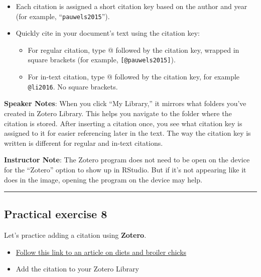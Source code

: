 \documentclass[
  letterpaper,
  DIV=11,
  numbers=noendperiod]{scrartcl}
\providecommand{\tightlist}{%
  \setlength{\itemsep}{0pt}\setlength{\parskip}{0pt}}
\begin{document}
\begin{itemize}
\item
  Each citation is assigned a short citation key based on the author and
  year (for example, ``\texttt{pauwels2015}'').
\item
  Quickly cite in your document's text using the citation key:

  \begin{itemize}
  \tightlist
  \item
    For regular citation, type @ followed by the citation key, wrapped
    in square brackets (for example, \texttt{{[}@pauwels2015{]}}).
  \item
    For in-text citation, type @ followed by the citation key, for
    example \texttt{@li2016}. No square brackets.
  \end{itemize}
\end{itemize}

\textbf{Speaker Notes}: When you click ``My Library,'' it mirrors what
folders you've created in Zotero Library. This helps you navigate to the
folder where the citation is stored. After inserting a citation once,
you see what citation key is assigned to it for easier referencing later
in the text. The way the citation key is written is different for
regular and in-text citations.

\textbf{Instructor Note}: The Zotero program does not need to be open on
the device for the ``Zotero'' option to show up in RStudio. But if it's
not appearing like it does in the image, opening the program on the
device may help.

\begin{center}\rule{0.5\linewidth}{0.5pt}\end{center}

\subsection{Practical exercise 8}\label{practical-exercise-8}

Let's practice adding a citation using \textbf{Zotero}.

\begin{itemize}
\tightlist
\item[$\square$]
  \href{https://journals.plos.org/plosone/article?id=10.1371/journal.pone.0127819}{Follow
  this link to an article on diets and broiler chicks}
\item[$\square$]
  Add the citation to your Zotero Library
\end{itemize}
\end{document}

